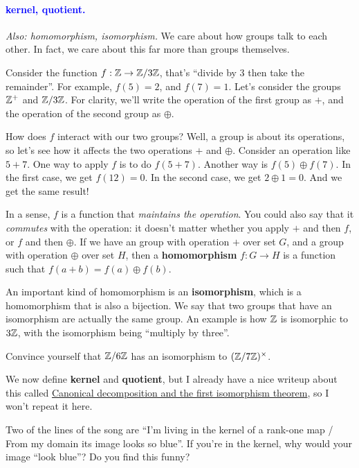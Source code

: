 \documentclass[11pt,paper=letter]{scrartcl}
\renewcommand{\bluebf}[1]{{\bfseries \color{Blue} #1}}
\renewcommand\wp[1]{\paragraph{\textcolor{Blue}{#1.}} \hspace{-1em}}
\newcommand\wl[1]{\label{w:#1}}
\newcommand\oww[1]{\textit{Also: #1.}}
\begin{document}
\wp{kernel, quotient}
\wl{kernel}
\wl{quotient}
\oww{homomorphism, isomorphism}
We care about how groups talk to each other. In fact, we care about this far more than groups themselves.

Consider the function $f : \mathbb Z \to \mathbb Z/3\mathbb Z$, that's ``divide by $3$ then take the remainder''. For example, $f(5) = 2$, and $f(7) = 1$. Let's consider the groups $\mathbb Z^+$ and $\mathbb Z/3\mathbb Z$. For clarity, we'll write the operation of the first group as $+$, and the operation of the second group as $\oplus$.

How does $f$ interact with our two groups? Well, a group is about its operations, so let's see how it affects the two operations $+$ and $\oplus$. Consider an operation like $5 + 7$. One way to apply $f$ is to do $f(5 + 7)$. Another way is $f(5) \oplus f(7)$. In the first case, we get $f(12) = 0$. In the second case, we get $2 \oplus 1 = 0$. And we get the same result!

In a sense, $f$ is a function that \textit{maintains the operation}. You could also say that it \textit{commutes} with the operation: it doesn't matter whether you apply $+$ and then $f$, or $f$ and then $\oplus$. If we have an group with operation $+$ over set $G$, and a group with operation $\oplus$ over set $H$, then a \textbf{homomorphism} $f : G \to H$ is a function such that $f(a + b) = f(a) \oplus f(b)$.

An important kind of homomorphism is an \textbf{isomorphism}, which is a homomorphism that is also a bijection. We say that two groups that have an isomorphism are actually the same group. An example is how $\mathbb Z$ is isomorphic to $3\mathbb Z$, with the isomorphism being ``multiply by three''.

\begin{exrboxed}
  Convince yourself that $\mathbb Z/6\mathbb Z$ has an isomorphism to $(\mathbb Z/7\mathbb Z)^\times$.
\end{exrboxed}

We now define \bluebf{kernel} and \bluebf{quotient}, but I already have a nice writeup about this called \href{https://cjquines.com/files/canonicaldecomposition.pdf}{Canonical decomposition and the first isomorphism theorem}, so I won't repeat it here.

\begin{exrboxed}
  Two of the lines of the song are ``I'm living in the kernel of a rank-one map / From my domain its image looks so blue''. If you're in the kernel, why would your image ``look blue''? Do you find this funny?
\end{exrboxed}
\end{document}
